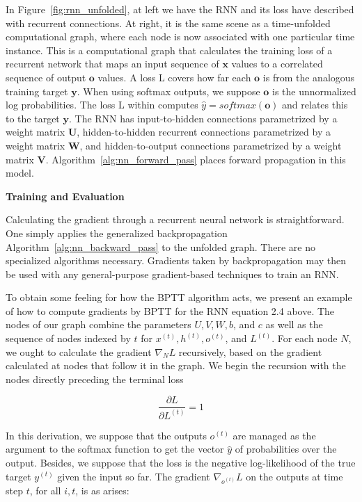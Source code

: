 In Figure~\ref{fig:rnn_unfolded}, at left we have the RNN and its loss have described with recurrent connections.
At right, it is the same scene as a time-unfolded computational graph,
where each node is now associated with one particular time instance.
This is a computational graph that calculates the training loss of a recurrent network that maps an input sequence
of $\textbf{x}$ values to a correlated sequence of output $\textbf{o}$ values.
A loss L covers how far each $\textbf{o}$ is from the analogous training target $\textbf{y}$.
When using softmax outputs, we suppose $\textbf{o}$ is the unnormalized log probabilities.
The loss L within computes $\hat{y} = softmax(\textbf{o})$ and relates this to the target $\textbf{y}$.
The RNN has input-to-hidden connections parametrized by a weight matrix $\textbf{U}$, hidden-to-hidden recurrent connections
parametrized by a weight matrix $\textbf{W}$, and hidden-to-output connections parametrized by a weight matrix $\textbf{V}$.
Algorithm~\ref{alg:nn_forward_pass} places forward propagation in this model.


{\large \textbf{Training and Evaluation}}

Calculating the gradient through a recurrent neural network is straightforward.
One simply applies the generalized backpropagation Algorithm~\ref{alg:nn_backward_pass} to the unfolded graph.
There are no specialized algorithms necessary.
Gradients taken by backpropagation may then be used with any general-purpose gradient-based techniques to train an RNN\@.

To obtain some feeling for how the BPTT algorithm acts, we present an example of how to compute gradients by BPTT for the RNN equation 2.4 above.
The nodes of our graph combine the parameters $U, V, W, b$, and $c$ as well as the sequence of nodes indexed by $t$ for $x^{(t)}, h^{(t)}, o^{(t)}$, and $L^{(t)}$.
For each node $N$, we ought to calculate the gradient $\nabla_N L$ recursively, based on the gradient calculated at nodes that follow it in the graph.
We begin the recursion with the nodes directly preceding the terminal loss

\begin{equation}
    \frac{\partial L}{\partial L^{(t)}} = 1\label{eq:equation10}
\end{equation}

In this derivation, we suppose that the outputs $o^{(t)}$ are managed as the argument to the softmax function to get the vector $\hat{y}$ of probabilities over the output.
Besides, we suppose that the loss is the negative log-likelihood of the true target $y^{(t)}$ given the input so far.
The gradient $\nabla_{o^{(t)}} L$ on the outputs at time step $t$, for all $i, t$, is as arises:

